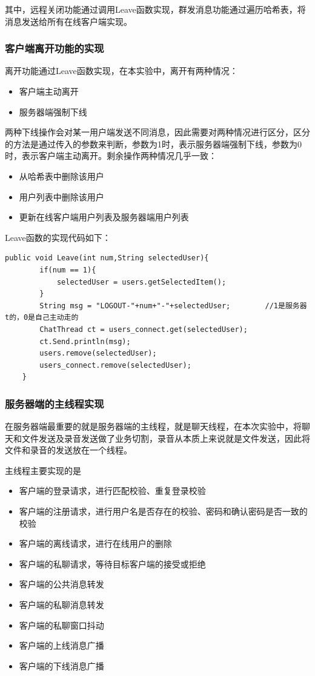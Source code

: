 \documentclass[UTF8,12pt]{article}
\begin{document}
其中，远程关闭功能通过调用Leave函数实现，群发消息功能通过遍历哈希表，将消息发送给所有在线客户端实现。

\subsubsection{客户端离开功能的实现}
离开功能通过Leave函数实现，在本实验中，离开有两种情况：
\begin{itemize}
    \item 客户端主动离开
    \item 服务器端强制下线
\end{itemize}
两种下线操作会对某一用户端发送不同消息，因此需要对两种情况进行区分，区分的方法是通过传入的参数来判断，参数为1时，表示服务器端强制下线，参数为0时，表示客户端主动离开。剩余操作两种情况几乎一致：
\begin{itemize}
    \item 从哈希表中删除该用户
    \item 用户列表中删除该用户
    \item 更新在线客户端用户列表及服务器端用户列表
\end{itemize}

Leave函数的实现代码如下：
\begin{lstlisting}[title=Leave函数的实现,frame=shadowbox]
    public void Leave(int num,String selectedUser){
        if(num == 1){
            selectedUser = users.getSelectedItem();
        }
        String msg = "LOGOUT-"+num+"-"+selectedUser;        //1是服务器t的，0是自己主动走的
        ChatThread ct = users_connect.get(selectedUser);
        ct.Send.println(msg);
        users.remove(selectedUser);
        users_connect.remove(selectedUser);
    }
\end{lstlisting}

\subsubsection{服务器端的主线程实现}
在服务器端最重要的就是服务器端的主线程，就是聊天线程，在本次实验中，将聊天和文件发送及录音发送做了业务切割，录音从本质上来说就是文件发送，因此将文件和录音的发送放在一个线程。

主线程主要实现的是
\begin{itemize}
    \item 客户端的登录请求，进行匹配校验、重复登录校验
    \item 客户端的注册请求，进行用户名是否存在的校验、密码和确认密码是否一致的校验
    \item 客户端的离线请求，进行在线用户的删除
    \item 客户端的私聊请求，等待目标客户端的接受或拒绝
    \item 客户端的公共消息转发
    \item 客户端的私聊消息转发
    \item 客户端的私聊窗口抖动
    \item 客户端的上线消息广播
    \item 客户端的下线消息广播
\end{itemize}
\end{document}
